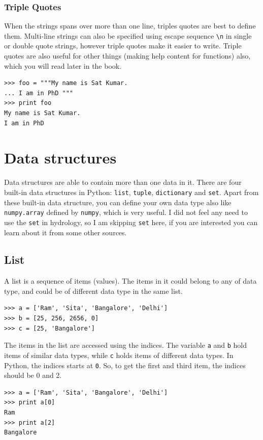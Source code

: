 \documentclass[10pt]{book}
\begin{document}
{\subsubsection{Triple Quotes}
When the strings spans over more than one line, triples quotes are best to define them. 
Multi-line strings can also be specified using escape sequence \verb"\n" in single or 
double quote strings, however triple quotes make it easier to write. 
Triple quotes are also useful for other things (making help content for functions) also, 
which you will read later in the book.
\beforeverb
\begin{verbatim}
>>> foo = """My name is Sat Kumar.
... I am in PhD """
>>> print foo
My name is Sat Kumar.
I am in PhD 
\end{verbatim}
\afterverb


\section{Data structures}
Data structures are able to contain more than one data in it. 
There are four built-in data structures in Python: 
\verb"list", \verb"tuple", \verb"dictionary" and \verb"set". 
Apart from these built-in data structure, you can define your own data type also 
like \verb"numpy.array" defined by \verb"numpy", which is very useful. 
I did not feel any need to use the \verb"set" in hydrology, so I am skipping \verb"set" here, 
if you are interested you can learn about it from some other sources. 

\subsection{List}
A list is a sequence of items (values). The items in it could belong to any of data type, and could be of different data type in the same list. 
\beforeverb \begin{verbatim}
>>> a = ['Ram', 'Sita', 'Bangalore', 'Delhi']
>>> b = [25, 256, 2656, 0]
>>> c = [25, 'Bangalore'] 
\end{verbatim} \afterverb
The items in the list are accessed using the indices. The variable \verb"a" and \verb"b" hold items of similar data types, while \verb"c" holds items of different data types. In Python, the indices starts at {\tt 0}. So, to get the first and third item, the indices should be 0 and 2.
\beforeverb
\begin{verbatim}
>>> a = ['Ram', 'Sita', 'Bangalore', 'Delhi']
>>> print a[0]
Ram
>>> print a[2]
Bangalore
\end{verbatim}
\afterverb

}
\end{document}
